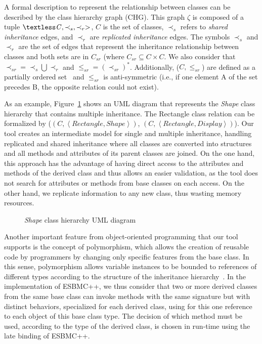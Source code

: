 \documentclass[a4paper]{llncs}
\begin{document}
A formal description to represent
the relationship between classes can be described by the class hierarchy graph
(CHG). This graph $\zeta$ is composed of a tuple $\textless \mathit{C}, \prec_{s}, \prec_{r}>$,
$\mathit{C}$ is the set of classes, $\prec_s $ refers to \textit{shared inheritance} edges,
and $\prec_r$ are \textit{replicated inheritance} edges. The symbols $\prec_{s}$ and $\prec_{r}$
are the set of edges that represent the inheritance relationship between
classes and both sets are in $\mathit{C_{sr}}$ (where $\mathit{C_{sr}} \subseteq \mathit{C} \times \mathit{C}$.
We also consider that $\prec_{sr} = \prec_s \bigcup \prec_r$ and $\leq_{sr} = (\prec_{sr})^*$.
Additionally, ($\mathit{C}, \leq_{sr}$) are defined as a partially ordered set~\cite{Neggers99}
and $\leq_{sr}$ is anti-symmetric (i.e., if one element A of the set precedes B,
the opposite relation could not exist).

As an example, Figure~\ref{figure:uml_diagram} shows an UML diagram
that represents the \textit{Shape} class hierarchy that contains multiple inheritance.
The Rectangle class relation can be formalized by
($\left(C, \left\langle Rectangle, Shape \right\rangle \right)$,
$\left(C, \left\langle Rectangle, Display \right\rangle \right)$).
Our tool creates an intermediate model for single and multiple inheritance, handling
replicated and shared inheritance where all classes are converted into structures and all
methods and attributes of its parent classes are joined. On the one hand, this approach has
the advantage of having direct access to the attributes and methods
of the derived class and thus allows an easier validation, as the tool
does not search for attributes or methods from base classes on each access.
On the other hand, we replicate information to any new class, thus wasting
memory resources.

\begin{figure}[ht]
\centering
\caption{\textit{Shape} class hierarchy UML diagram}
\label{figure:uml_diagram}
\end{figure}

Another important feature from object-oriented programming that our tool
supports is the concept of polymorphism, which allows the creation of
reusable code by programmers by changing only specific features from the base class.
In this sense, polymorphism allows variable instances to be
bounded to references of different types according to the structure of the
inheritance hierarchy~\cite{Alexander02}.
In the implementation of ESBMC++, we thus consider that two or more derived classes
from the same base class can invoke methods with the same signature but with distinct behaviors,
specialized for each derived class, using for this one reference to each object of
this base class type. The decision of which method must be used, according to the type
of the derived class, is chosen in run-time using the late binding of ESBMC++.
\end{document}
